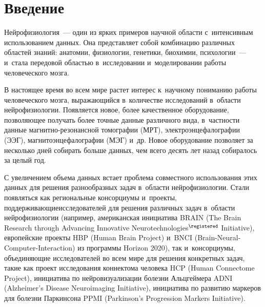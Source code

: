
  
\vspace*{6pt}



\thispagestyle{headings}

\begin{multicols}{2}

\label{st\stat}

\section{Введение}


    Нейрофизиология~--- один из ярких примеров научной области 
с~интенсивным использованием данных. Она представляет собой 
комбинацию различных областей знаний: анатомии, физиологии, генетики, 
биохимии, психологии~--- и~стала передовой областью в~исследовании 
и~моделировании работы человеческого мозга.
    
    В настоящее время во всем мире растет интерес к~научному пониманию 
работы человеческого мозга, выражающийся в~количестве исследований 
в~области нейрофизиологии. Появляется новое, более качественное 
оборудование, поз\-во\-ля\-ющее получать более точные данные различного вида, 
в~част\-ности данные маг\-нит\-но-ре\-зо\-нанс\-ной томографии (МРТ), 
электроэнцефалографии (ЭЭГ), магнитоэнцефалографии (МЭГ) и~др. Новое 
оборудование позволяет за несколько дней собирать больше данных, чем 
всего десять лет назад собиралось за целый год.
    
    С увеличением объема данных встает проблема совместного 
использования этих данных для решения разнообразных задач в~области 
нейрофизиологии.
Стали появляться как региональные консорциумы 
и~проекты, поддерживающие\linebreak исследователей для решения различных задач 
в~об\-ласти нейрофизиологии (например, американская инициатива BRAIN
(The Brain Research through Advancing Innovative 
Neurotechnologies$^\registered$ Initiative), 
европейские проекты HBP (Human Brain Project)
и~BNCI (Brain-Neural-Computer-Interaction)
из программы Horizon 2020), так 
и~консорциумы, объединяющие исследователей во всем мире для решения 
конкретных задач, такие как проект исследования коннектома человека HCP
(Human Connectome Project), 
инициатива по нейровизуализации болезни Альцгеймера ADNI
(Alzheimer's Disease Neuroimaging 
Initiative), инициатива 
по развитию маркеров для болезни Паркинсона PPMI
(Parkinson's Progression Markers Initiative).
{

}
\end{multicols}
